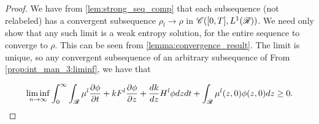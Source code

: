 \begin{proof}
	We have from \eqref{lem:strong_seq_comp} that each subsequence (not relabeled) has a convergent subsequence $\rho_l \rightarrow \rho$ in $\mathscr{C}([0,T], L^1(\mathscr{R}))$. 
	We need only show that any such limit is a weak entropy solution, for the entire sequence to converge to $\rho$. This can be seen from \eqref{lemma:convergence_result}.  The limit is unique, so any convergent subsequence of an arbitrary subsequence of  
	From \eqref{prop:int_man_3:liminf}, we have that 
	
	\begin{align} \label{pf:weak_entropy:liminf}
		\liminf_{n \rightarrow \infty}\int_0^{\infty} \int_{\mathscr{R}}  \mu^l \frac{\partial \phi}{\partial t} + k F^l \frac{\partial \phi}{\partial z}  + \frac{ d k}{dz}H^l \phi dz dt + \int_{\mathscr{R}} \mu^l(z,0) \phi(z,0) dz\geq 0.
	\end{align}
	

\end{proof}
